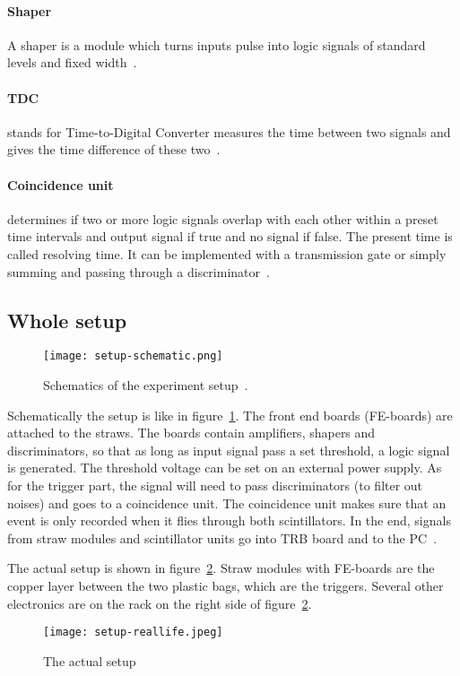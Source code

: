 \paragraph{Shaper}
A shaper is a module which turns inputs pulse into logic signals of standard levels and fixed width~\cite{leo}.

\paragraph{TDC}
stands for Time-to-Digital Converter measures the time between two signals and gives the time difference of these two~\cite{leo}.

\paragraph{Coincidence unit}
determines if two or more logic signals overlap with each other within a preset time intervals and output signal if true and no signal if false. The present time is called resolving time. It can be implemented with a transmission gate or simply summing and passing through a discriminator~\cite{leo}.

\subsection{Whole setup}
\begin{figure}[ht]
	\centering
	\texttt{[image: setup-schematic.png]}
	\caption{Schematics of the experiment setup~\cite{manual}.}%
	\label{fig:setup}
\end{figure}
Schematically the setup is like in figure~\ref{fig:setup}. The front end boards (FE-boards) are attached to the straws. The boards contain amplifiers, shapers and discriminators, so that as long as input signal pass a set threshold, a logic signal is generated. The threshold voltage can be set on an external power supply. As for the trigger part, the signal will need to pass discriminators (to filter out noises) and goes to a coincidence unit. The coincidence unit makes sure that an event is only recorded when it flies through both scintillators. In the end, signals from straw modules and scintillator units go into TRB board and to the PC~\cite{manual}.

The actual setup is shown in figure~\ref{fig:setup-real}. Straw modules with FE-boards are the copper layer between the two plastic bags, which are the triggers. Several other electronics are on the rack on the right side of figure~\ref{fig:setup-real}.

\begin{figure}[ht]
	\centering
	\texttt{[image: setup-reallife.jpeg]}
	\caption{The actual setup}%
	\label{fig:setup-real}
\end{figure}
